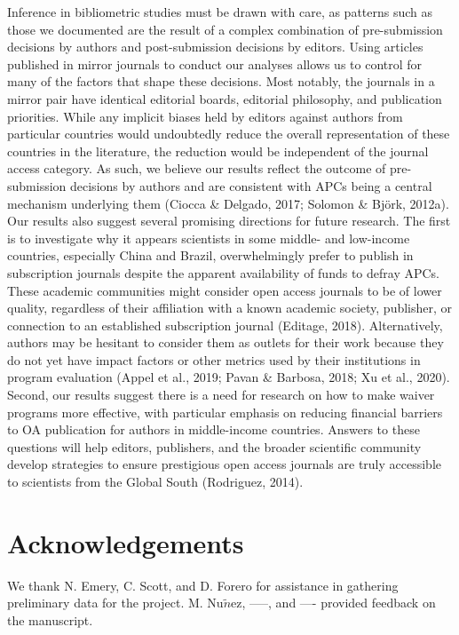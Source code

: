 \documentclass[english,man]{apa6}
\begin{document}
Inference in bibliometric studies must be drawn with care, as patterns such as those we documented are the result of a complex combination of pre-submission decisions by authors and post-submission decisions by editors. Using articles published in mirror journals to conduct our analyses allows us to control for many of the factors that shape these decisions. Most notably, the journals in a mirror pair have identical editorial boards, editorial philosophy, and publication priorities. While any implicit biases held by editors against authors from particular countries would undoubtedly reduce the overall representation of these countries in the literature, the reduction would be independent of the journal access category. As such, we believe our results reflect the outcome of pre-submission decisions by authors and are consistent with APCs being a central mechanism underlying them (Ciocca \& Delgado, 2017; Solomon \& Björk, 2012a). Our results also suggest several promising directions for future research. The first is to investigate why it appears scientists in some middle- and low-income countries, especially China and Brazil, overwhelmingly prefer to publish in subscription journals despite the apparent availability of funds to defray APCs. These academic communities might consider open access journals to be of lower quality, regardless of their affiliation with a known academic society, publisher, or connection to an established subscription journal (Editage, 2018). Alternatively, authors may be hesitant to consider them as outlets for their work because they do not yet have impact factors or other metrics used by their institutions in program evaluation (Appel et al., 2019; Pavan \& Barbosa, 2018; Xu et al., 2020). Second, our results suggest there is a need for research on how to make waiver programs more effective, with particular emphasis on reducing financial barriers to OA publication for authors in middle-income countries. Answers to these questions will help editors, publishers, and the broader scientific community develop strategies to ensure prestigious open access journals are truly accessible to scientists from the Global South (Rodriguez, 2014).

\hypertarget{acknowledgements}{%
\section{Acknowledgements}\label{acknowledgements}}

We thank N. Emery, C. Scott, and D. Forero for assistance in gathering preliminary data for the project. M. Nu\(\tilde{n}\)ez, -----, and ---- provided feedback on the manuscript.
\end{document}
